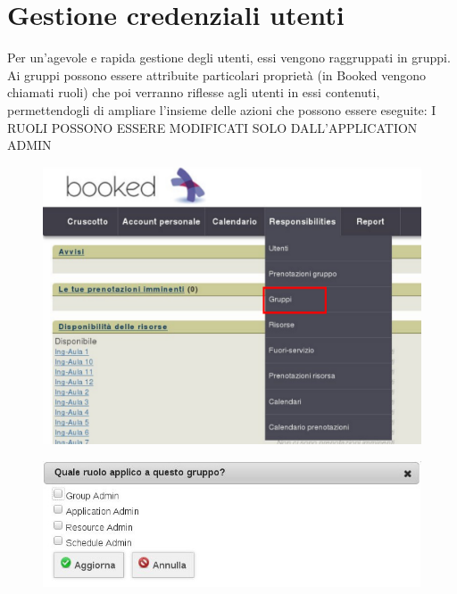 \section{Gestione credenziali utenti}
Per un'agevole e rapida gestione degli utenti, essi vengono raggruppati
in gruppi. Ai gruppi possono essere attribuite particolari
proprietà (in Booked vengono chiamati ruoli) che poi verranno
riflesse agli utenti in essi contenuti, permettendogli di ampliare l'insieme
delle azioni che possono essere eseguite: I RUOLI POSSONO ESSERE MODIFICATI SOLO
DALL'APPLICATION ADMIN

\begin{figure}[H]
\centering{}\includegraphics[scale=0.5]{Immagini/amministratore_menu_generale_selezione_gruppi.pdf}
\normalsize
\caption{}
\label{fig:amministratore_menu_generale_selezione_gruppi.pdf}
\end{figure}



\begin{figure}[H]
\centering{}\includegraphics[scale=0.7]{Immagini/ruoli_gruppo.jpeg}
\normalsize
\caption{}
\label{fig:Ruoli assegnabili ad un gruppo}
\end{figure}


